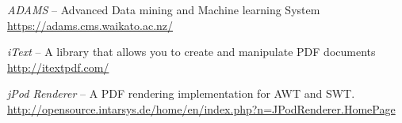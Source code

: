 %

\begin{thebibliography}{999}

		\textit{ADAMS} -- Advanced Data mining and Machine learning System \\
		\url{https://adams.cms.waikato.ac.nz/}{}
		
		\textit{iText} -- A library that allows you to create and manipulate 
		PDF documents \\
		\url{http://itextpdf.com/}{}
		
		\textit{jPod Renderer} -- A PDF rendering implementation for AWT and SWT.  \\
		\url{http://opensource.intarsys.de/home/en/index.php?n=JPodRenderer.HomePage}{}

\end{thebibliography}
